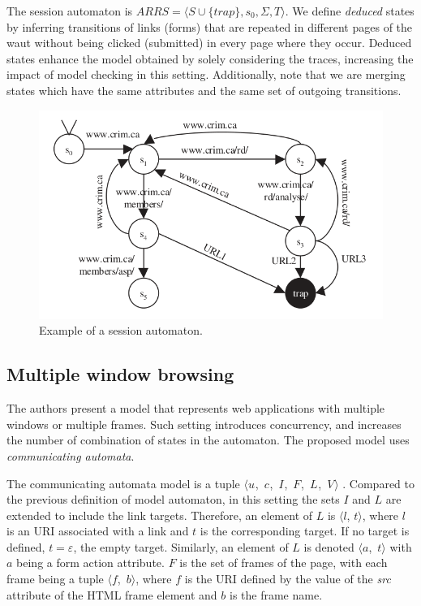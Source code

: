 \documentclass[a4paper,10pt]{article}
\newcommand{\tuple}[1]{\mbox{$\langle$#1$\rangle$}}
\newcommand{\resmulti}[1][]{
  \ifthenelse{\equal{#1}{}}{\mbox{$\langle u$, $c$, $I$, $F$, $L$, $V\rangle$}}
  {\mbox{$\langle u_{#1}$, $c_{#1}$, $I_{#1}$, $F_{#1}$, $L_{#1}$, $V_{#1}\rangle$}}
}
\begin{document}
The session automaton is $ARRS = \langle S \cup \{trap\}, s_0, \Sigma, T \rangle$. We define \emph{deduced} states by inferring transitions of links (forms) that are repeated in different pages of the \gls{waut} without being clicked (submitted) in every page where they occur. Deduced states enhance the model obtained by solely considering the traces, increasing the impact of model checking in this setting. Additionally, note that we are merging states which have the same attributes and the same set of outgoing transitions.

\begin{figure}[h]
  \includegraphics[width=\textwidth]{img/session_automaton_example.png}
  \caption{Example of a session automaton.}
\end{figure}

\subsection{Multiple window browsing}
\label{multiple-window-browsing}

The authors present a model that represents web applications with multiple windows or multiple frames. Such setting introduces concurrency, and increases the number of combination of states in the automaton. The proposed model uses \emph{communicating automata}.

The communicating automata model is a tuple \resmulti. Compared to the previous definition of model automaton, in this setting the sets $I$ and $L$ are extended to include the link targets. Therefore, an element of $L$ is $\langle$$l$, $t$$\rangle$, where $l$ is an URI associated with a link and $t$ is the corresponding target. If no target is defined, $t = \varepsilon$, the empty target. Similarly, an element of $L$ is denoted \tuple{$a$, $t$} with $a$ being a form action attribute. $F$ is the set of frames of the page, with each frame being a tuple \tuple{$f$, $b$}, where $f$ is the URI defined by the value of the \textit{src} attribute of the HTML frame element and $b$ is the frame name.
\end{document}
